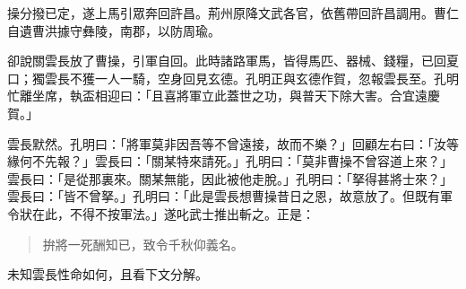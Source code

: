 操分撥已定，遂上馬引眾奔回許昌。荊州原降文武各官，依舊帶回許昌調用。曹仁自遺曹洪據守彝陵，南郡，以防周瑜。

卻說關雲長放了曹操，引軍自回。此時諸路軍馬，皆得馬匹、器械、錢糧，已回夏口；獨雲長不獲一人一騎，空身回見玄德。孔明正與玄德作賀，忽報雲長至。孔明忙離坐席，執盃相迎曰：「且喜將軍立此蓋世之功，與普天下除大害。合宜遠慶賀。」

雲長默然。孔明曰：「將軍莫非因吾等不曾遠接，故而不樂？」回顧左右曰：「汝等緣何不先報？」雲長曰：「關某特來請死。」孔明曰：「莫非曹操不曾容道上來？」雲長曰：「是從那裏來。關某無能，因此被他走脫。」孔明曰：「拏得甚將士來？」雲長曰：「皆不曾拏。」孔明曰：「此是雲長想曹操昔日之恩，故意放了。但既有軍令狀在此，不得不按軍法。」遂叱武士推出斬之。正是：

\begin{quote}
拚將一死酬知已，致令千秋仰義名。
\end{quote}

未知雲長性命如何，且看下文分解。
